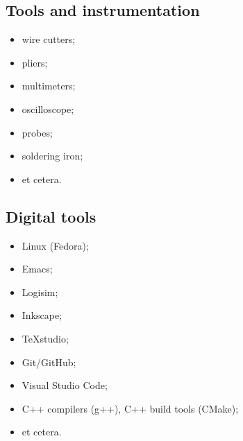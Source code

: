 \subsection{Tools and instrumentation}
\begin{itemize}
	\item wire cutters;
	\item pliers;
	\item multimeters;
	\item oscilloscope;
	\item probes;
	\item soldering iron;
	\item et cetera.
\end{itemize}

\subsection{Digital tools}
\begin{itemize}
	\item Linux (Fedora);
	\item Emacs;
	\item Logisim;
	\item Inkscape;
	\item TeXstudio;
	\item Git/GitHub;
	\item Visual Studio Code;
	\item C++ compilers (g++), C++ build tools (CMake);
	\item et cetera.
\end{itemize}
